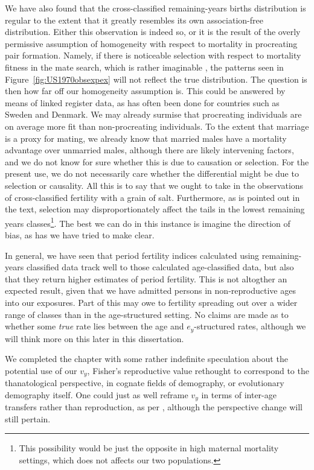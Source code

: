 We have also found that the cross-classified remaining-years births distribution
is regular to the extent that it greatly resembles its own association-free
distribution. Either this observation is indeed so, or it is the result of the
overly permissive assumption of homogeneity with respect to mortality in
procreating pair formation. Namely, if there is noticeable selection with
respect to mortality fitness in the mate search, which is rather imaginable
\citep{gangestad1993pathogen, roberts2008good}, the patterns seen in
Figure~\ref{fig:US1970obsexpex} will not reflect the true distribution. The
question is then how far off our homogeneity assumption is. This could be
answered by means of linked register data, as has often been done for countries
such as Sweden and Denmark. We may already surmise that procreating individuals
are on average more fit than non-procreating individuals. To the extent that
marriage is a proxy for mating, we already know that married males have a
mortality advantage over unmarried males, although
there are likely intervening factors\citep[see
e.g.][]{rogers1995marriage, waite1995does}, and we do not know for sure whether
this is due to causation or selection\citep[see e.g.][]{goldman1993marriage}. For the
present use, we do not necessarily care whether the differential might be due to
selection or causality. All this is to say that we ought to take in the
observations of cross-classified fertility with a grain of salt. Furthermore, as
is pointed out in the text, selection may disproportionately affect the tails 
in the lowest remaining years classes\footnote{This possibility would be just
the opposite in high maternal mortality settings, which does not affects
our two populations.}. The best we can do in this instance is imagine the
direction of bias, as has we have tried to make clear.

In general, we have seen that period fertility indices calculated using
remaining-years classified data track well to those calculated age-classified
data, but also that they return higher estimates of period fertility. This is
not altogther an expected result, given that we have admitted persons in
non-reproductive ages into our exposures. Part of this may owe to fertility
spreading out over a wider range of classes than in the age-structured setting.
No claims are made as to whether some \textit{true} rate lies between the age
and $e_y$-structured rates, although we will think more on this later in this
dissertation.

We completed the chapter with some rather indefinite speculation about the
potential use of our $v_y$, Fisher's reproductive value rethought to correspond
to the thanatological perspective, in cognate fields of demography, or
evolutionary demography itself. One could just as well reframe $v_y$ in terms of
inter-age transfers rather than reproduction, as per \citet{lee2003rethinking},
although the perspective change will still pertain.

